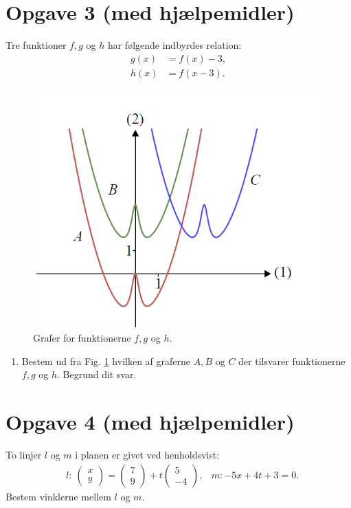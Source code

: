 \section*{Opgave 3 \large (med hjælpemidler)}
Tre funktioner $f,g$ og $h$ har følgende indbyrdes relation:
\begin{align*}
g(x) &= f(x) -3,\\
h(x) &= f(x-3).
\end{align*}
\begin{figure}[H]
\centering
\includegraphics[scale=0.5]{Billeder/fgh.png}
\caption{Grafer for funktionerne $f,g$ og $h$.}
\label{fig:fgh}
\end{figure}
\begin{enumerate}[label=\roman*)]
\item Bestem ud fra Fig. \ref{fig:fgh} hvilken af graferne $A,B$ og $C$ der tilsvarer funktionerne $f,g$ og $h$. Begrund dit svar.
\end{enumerate}


\section*{Opgave 4 \large (med hjælpemidler) }
To linjer $l$ og $m$ i planen er givet ved henholdsvist:
\begin{align*}
&l:\  \begin{pmatrix} x\\y \end{pmatrix} = \begin{pmatrix} 7\\9 \end{pmatrix} +t\begin{pmatrix} 5\\-4 \end{pmatrix},
&m: -5x+4t+3=0.
\end{align*}
Bestem vinklerne mellem $l$ og $m$.

